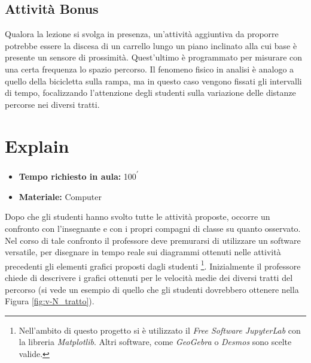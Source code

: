 \documentclass{report} \usepackage[T1]{fontenc} \usepackage[italian]{babel}
\begin{document}
\subsection{Attività Bonus}
Qualora la lezione si svolga in presenza, un'attività aggiuntiva da
proporre potrebbe essere la discesa di un carrello lungo un piano inclinato
alla cui base è presente un sensore di prossimità. Quest’ultimo è programmato
per misurare con una certa frequenza lo spazio percorso.
Il fenomeno fisico in analisi è analogo a quello della bicicletta sulla rampa,
ma in questo caso vengono fissati gli
intervalli di tempo, focalizzando l’attenzione degli studenti sulla variazione
delle distanze percorse nei diversi tratti.

\section{Explain}\label{a_explain}

\begin{itemize}
\item \textbf{Tempo richiesto in aula:} 100\textsuperscript{$\prime$}
\item \textbf{Materiale:} Computer
\end{itemize}

Dopo che gli studenti hanno svolto tutte le attività proposte, occorre un
confronto con l’insegnante e con i propri compagni di classe su quanto
osservato. Nel corso di tale confronto il professore deve premurarsi di
utilizzare un software versatile, per disegnare in tempo reale
sui diagrammi ottenuti nelle attività precedenti gli elementi grafici
proposti dagli studenti
\footnote{
          Nell'ambito di questo progetto si è utilizzato il
          \emph{Free Software}
          \emph{JupyterLab} con la libreria \emph{Matplotlib}.
          Altri software, come \emph{GeoGebra} o \emph{Desmos}
          sono scelte valide.
         }.
Inizialmente il professore chiede di descrivere i grafici ottenuti per le
velocità medie dei diversi tratti del percorso (si vede un esempio di quello
che gli studenti dovrebbero ottenere nella Figura \ref{fig:v-N_tratto}).
\end{document}
